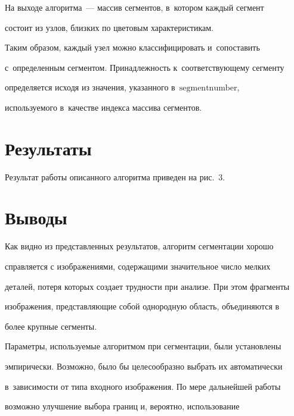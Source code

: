   

  На выходе алгоритма~--- массив сегментов, в~котором каждый сегмент 

состоит из узлов, близких по цветовым характеристикам.

  

  Таким образом, каждый узел можно классифицировать и~сопоставить 

  с~определенным сегментом. Принадлежность к~соответствующему сегменту 

определяется исходя из значения, указанного в~$\mathrm{segmentnumber}$, 

используемого в~качестве индекса массива сегментов.

\vspace*{-3pt}



\section{Результаты}



  Результат работы описанного алгоритма приведен на рис.~3. 

\vspace*{-3pt}



\section{Выводы}



  Как видно из представленных результатов, алгоритм сегментации хорошо 

справляется с изображениями, содержащими значительное число мелких 

деталей, потеря которых создает трудности при анализе. При этом фрагменты 

изображения, представляющие собой однородную область, объединяются в 

более крупные сегменты.

  

  Параметры, используемые алгоритмом при сегментации, были установлены 

эмпирически. Возможно, было бы целесообразно выбрать их автоматически 

в~зависимости от типа входного изображения. По мере дальнейшей работы 

возможно улучшение выбора границ и, вероятно, использование 

